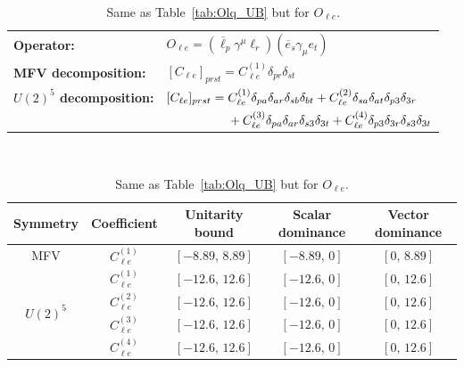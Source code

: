 \begin{table}[htbp]
\centering
{\small
\begin{tabular}{ll}
    \textbf{Operator:} &
        $\boxed{O_{\ell e} = (\overline\ell_p \gamma^\mu \ell_r)(\overline e_s \gamma_\mu e_t)}$ \\[0.2cm]
    \textbf{MFV decomposition:} &
        $[C_{\ell e}]_{prst} = C_{\ell e}^{(1)}\delta_{pr}\delta_{st}$ \\[0.15cm]
    \textbf{$U(2)^5$ decomposition:} &
        $[C_{\ell e}]_{prst} =
            C_{\ell e}^{(1)}\Pij{p}{r}{a}\Pij{s}{t}{b}
            + C_{\ell e}^{(2)}\Pij{s}{t}{a}\delta_{p3}\delta_{3r}$ \\
        & $\phantom{[C_{\ell e}]_{prst} ={}}+ C_{\ell e}^{(3)}\Pij{p}{r}{a}\delta_{s3}\delta_{3t}
            + C_{\ell e}^{(4)}\delta_{p3}\delta_{3r}\delta_{s3}\delta_{3t}$ \\
\end{tabular}
\\[0.3cm]
\renewcommand{\arraystretch}{1.3}
\begin{tabular}{ccccc}
    \toprule
    \rowcolor{hdrcolor}
    \textbf{Symmetry} & \textbf{Coefficient}
        & \textbf{Unitarity bound}
        & \textbf{Scalar dominance}
        & \textbf{Vector dominance} \\
    \midrule
    \multirow{1}{*}{MFV}
        & $C_{\ell e}^{(1)}$ & $[-8.89,\, 8.89]$ & $[-8.89,\, 0]$ & $[0,\, 8.89]$ \\
    \midrule
    \multirow{4}{*}{$U(2)^5$}
        & $C_{\ell e}^{(1)}$ & $[-12.6,\, 12.6]$ & $[-12.6,\, 0]$ & $[0,\, 12.6]$ \\
        & $C_{\ell e}^{(2)}$ & $[-12.6,\, 12.6]$ & $[-12.6,\, 0]$ & $[0,\, 12.6]$ \\
        & $C_{\ell e}^{(3)}$ & $[-12.6,\, 12.6]$ & $[-12.6,\, 0]$ & $[0,\, 12.6]$ \\
        & $C_{\ell e}^{(4)}$ & $[-12.6,\, 12.6]$ & $[-12.6,\, 0]$ & $[0,\, 12.6]$ \\
    \bottomrule
\end{tabular}}
\caption{Same as Table~\ref{tab:Olq_UB} but for $O_{\ell e}$.}
\label{tab:Ole_UB}
\end{table}

